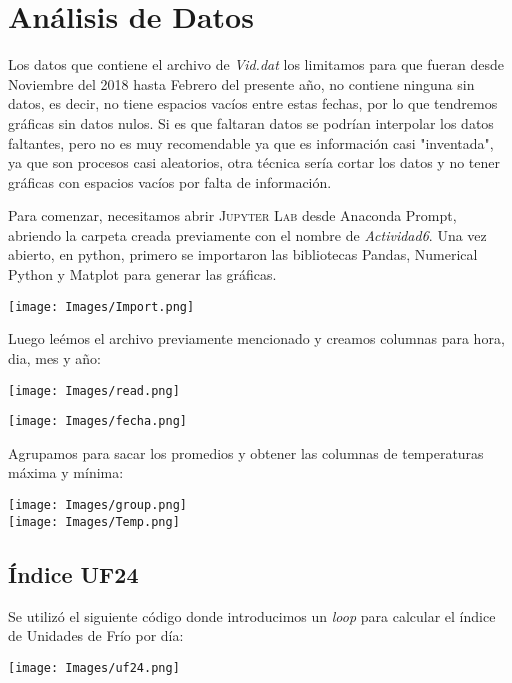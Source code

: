 \documentclass{article}
\begin{document}
\section{Análisis de Datos}
Los datos que contiene el archivo de \textit{Vid.dat} los limitamos para que fueran desde Noviembre del 2018 hasta Febrero del presente año, no contiene ninguna sin datos, es decir, no tiene espacios vacíos entre estas fechas, por lo que tendremos gráficas sin datos nulos. Si es que faltaran datos se podrían interpolar los datos faltantes, pero no es muy recomendable ya que es información casi "inventada", ya que son procesos casi aleatorios, otra técnica sería cortar los datos y no tener gráficas con espacios vacíos por falta de información.

\noindent Para comenzar, necesitamos abrir \textsc{Jupyter Lab} desde Anaconda Prompt, abriendo la carpeta creada previamente con el nombre de \textit{Actividad6}.
Una vez abierto, en python, primero se importaron las bibliotecas Pandas, Numerical Python y Matplot para generar las gráficas.

\begin{center}
    \texttt{[image: Images/Import.png]}
\end{center}
Luego leémos el archivo previamente mencionado y creamos columnas para hora, dia, mes y año:
\begin{center}
    \texttt{[image: Images/read.png]}
\end{center}
\begin{center}
    \texttt{[image: Images/fecha.png]}
\end{center}
Agrupamos para sacar los promedios y obtener las columnas de temperaturas máxima y mínima:
\begin{center}
    \texttt{[image: Images/group.png]}
    \\
    \texttt{[image: Images/Temp.png]}
\end{center}
\begin{center}

\end{center}

\subsection{Índice UF24}
Se utilizó el siguiente código donde introducimos un \textit{loop} para calcular el índice de Unidades de Frío por día:
\begin{center}
    \texttt{[image: Images/uf24.png]}
\end{center}
\end{document}
